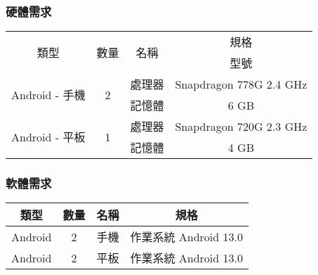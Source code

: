 \subsubsection{硬體需求}
 
\begin{tabular}{|c|c|c|c|}
  \hline
  \multirow{2}{*}{類型} & \multirow{2}{*}{數量} & \multirow{2}{*}{名稱} & 規格 \\
  \cline{4-4} & & & 型號 \\
  \hline
  \multirow{2}{*}{Android - 手機} & \multirow{2}{*}{2} & 處理器 & Snapdragon 778G 2.4 GHz \\
  \cline{3-4} & & 記憶體 & 6 GB \\
  \hline
  \multirow{2}{*}{Android - 平板} & \multirow{2}{*}{1} & 處理器 & Snapdragon 720G 2.3 GHz \\
  \cline{3-4} & & 記憶體 & 4 GB \\
  \hline
\end{tabular}

\subsubsection{軟體需求}

\begin{tabular}{|c|c|c|c|}
  \hline
  類型 & 數量 & 名稱 & 規格 \\
  \hline
  Android & 2 & 手機 & 作業系統 Android 13.0 \\
  \hline
  Android & 2 & 平板 & 作業系統 Android 13.0 \\
  \hline
\end{tabular}
